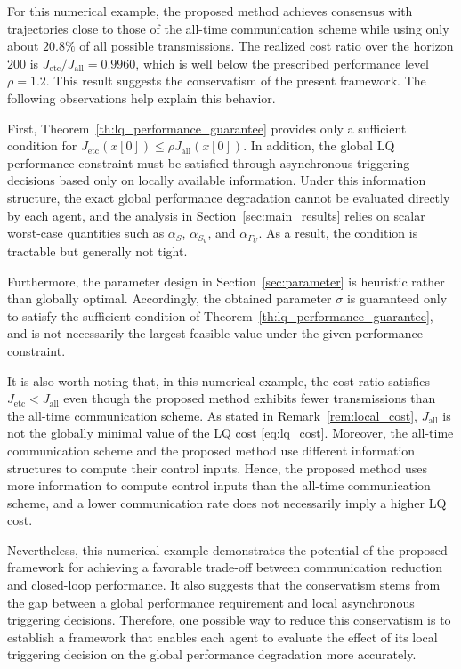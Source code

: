 \documentclass[letterpaper,10pt,conference]{ieeeconf}
\begin{document}
For this numerical example, the proposed method achieves consensus with trajectories close to those of the all-time communication scheme while using only about $20.8\%$ of all possible transmissions.
The realized cost ratio over the horizon $200$ is $J_{\mathrm{etc}}/J_{\mathrm{all}} = 0.9960$, which is well below the prescribed performance level $\rho = 1.2$.
This result suggests the conservatism of the present framework.
The following observations help explain this behavior.

First, Theorem~\ref{th:lq_performance_guarantee} provides only a sufficient condition for $J_{\mathrm{etc}}(x[0]) \leq \rho J_{\mathrm{all}}(x[0])$.
In addition, the global LQ performance constraint must be satisfied through asynchronous triggering decisions based only on locally available information.
Under this information structure, the exact global performance degradation cannot be evaluated directly by each agent, and the analysis in Section~\ref{sec:main_results} relies on scalar worst-case quantities such as $\alpha_S$, $\alpha_{S_u}$, and $\alpha_{\Gamma_U}$.
As a result, the condition is tractable but generally not tight.

Furthermore, the parameter design in Section~\ref{sec:parameter} is heuristic rather than globally optimal.
Accordingly, the obtained parameter $\sigma$ is guaranteed only to satisfy the sufficient condition of Theorem~\ref{th:lq_performance_guarantee}, and is not necessarily the largest feasible value under the given performance constraint.

It is also worth noting that, in this numerical example, the cost ratio satisfies $J_{\mathrm{etc}} < J_{\mathrm{all}}$ even though the proposed method exhibits fewer transmissions than the all-time communication scheme.
As stated in Remark~\ref{rem:local_cost}, $J_{\mathrm{all}}$ is not the globally minimal value of the LQ cost \eqref{eq:lq_cost}.
Moreover, the all-time communication scheme and the proposed method use different information structures to compute their control inputs.
Hence, the proposed method uses more information to compute control inputs than the all-time communication scheme, and a lower communication rate does not necessarily imply a higher LQ cost.

Nevertheless, this numerical example demonstrates the potential of the proposed framework for achieving a favorable trade-off between communication reduction and closed-loop performance.
It also suggests that the conservatism stems from the gap between a global performance requirement and local asynchronous triggering decisions.
Therefore, one possible way to reduce this conservatism is to establish a framework that enables each agent to evaluate the effect of its local triggering decision on the global performance degradation more accurately.
\end{document}
